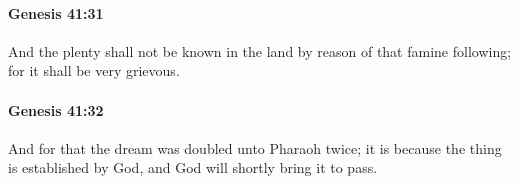 		\paragraph{Genesis 41:31} %
			\label{GENESIS-41-31}

			And the plenty shall not be known in the land by reason of that famine following; for it shall be very grievous.


		\paragraph{Genesis 41:32} %
			\label{GENESIS-41-32}

			And for that the dream was doubled unto Pharaoh twice; it is because the thing is established by God, and God will shortly bring it to pass.


